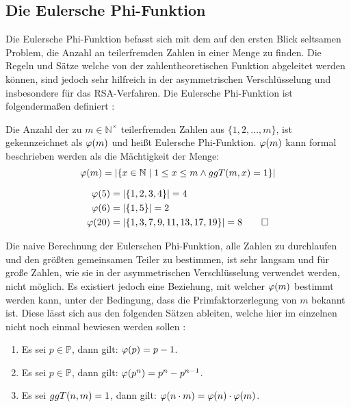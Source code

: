 \subsection{Die Eulersche Phi-Funktion}
Die Eulersche Phi-Funktion befasst sich mit dem auf den ersten Blick seltsamen
Problem, die Anzahl an teilerfremden Zahlen in einer Menge zu finden. Die Regeln
und Sätze welche von der zahlentheoretischen Funktion abgeleitet werden können, sind jedoch sehr
hilfreich in der asymmetrischen Verschlüsselung und insbesondere für das
RSA-Verfahren. Die Eulersche Phi-Funktion ist folgendermaßen definiert
\parencite[165]{BOOK:crypto} \parencite{SITE:phi-euler-fermat}:

\begin{definition}
  Die Anzahl der zu $m \in \mathbb{N}^\times$ teilerfremden Zahlen aus $\{1,2,\dots,m\}$,
  ist gekennzeichnet als $\varphi(m)$ und heißt Eulersche Phi-Funktion. $\varphi(m)$
  kann formal beschrieben werden als die Mächtigkeit der Menge:
  \begin{equation*}
    \varphi(m) = \vert \{x \in \mathbb{N} \mid 1 \leq x \leq m \wedge ggT(m,x) = 1 \} \vert
  \end{equation*}
\end{definition}

\begin{example}
  \begin{align*}
    \varphi(5)  & = \vert \{1,2,3,4\} \vert = 4                      \\
    \varphi(6)  & = \vert \{1,5\} \vert = 2                          \\
    \varphi(20) & = \vert \{1,3,7,9,11,13,17,19\} \vert = 8 \qedhere
  \end{align*}
\end{example}

\noindent
Die naive Berechnung der Eulerschen Phi-Funktion, alle Zahlen zu durchlaufen und den
größten gemeinsamen Teiler zu bestimmen, ist sehr langsam und für große Zahlen, wie sie
in der asymmetrischen Verschlüsselung verwendet werden, nicht möglich. Es existiert jedoch
eine Beziehung, mit welcher $\varphi(m)$ bestimmt werden kann, unter der
Bedingung, dass die Primfaktorzerlegung von $m$ bekannt ist. Diese lässt sich aus
den folgenden Sätzen ableiten, welche hier im einzelnen nicht noch einmal bewiesen werden
sollen \parencite{SITE:phi-euler-fermat}:
\begin{enumerate}[ref=(\arabic*)]
  \item Es sei $p \in \mathbb{P}$, dann gilt: $\varphi(p) = p - 1$. \label{enum:phi1}
  \item Es sei $p \in \mathbb{P}$, dann gilt: $\varphi(p^n) = p^n - p^{n-1}$. \label{enum:phi2}
  \item Es sei $ggT(n,m) = 1$, dann gilt:
        $\varphi(n \cdot m) = \varphi(n) \cdot \varphi(m)$. \label{enum:phi3}
\end{enumerate}

